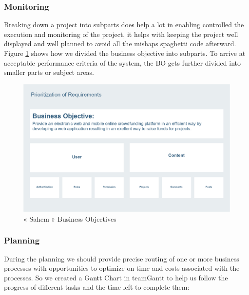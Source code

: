 \subsubsection*{Monitoring}
Breaking down a project into subparts does help a lot in enabling controlled the execution and monitoring of the project, it helps with keeping the project well displayed and well planned to avoid all the mishaps spaghetti code afterward.
Figure \ref{fig:bos} shows how we divided the business objective into subparts. To arrive at acceptable performance criteria of the system, the BO gets further divided into smaller parts or subject areas.
\begin{figure}[H]
      \center
      \includegraphics[scale=0.18]{assets/bos.png}
      \caption{« Sahem » Business Objectives}
      \label{fig:bos}
\end{figure}

\subsubsection*{Planning}
During the planning we should provide precise routing of one or more business processes with opportunities to optimize on time and costs associated with the processes.
So we created a Gantt Chart in teamGantt to help us follow the progress of different tasks and the time left to complete them:
\clearpage

